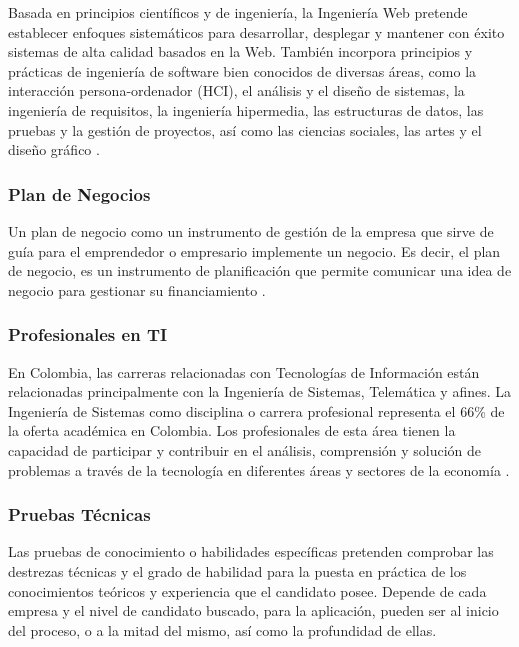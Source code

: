Basada en principios científicos y de ingeniería, la Ingeniería Web pretende establecer enfoques sistemáticos para desarrollar, desplegar y mantener con éxito sistemas de alta calidad basados en la Web. También incorpora principios y prácticas de ingeniería de software bien conocidos de diversas áreas, como la interacción persona-ordenador (HCI), el análisis y el diseño de sistemas, la ingeniería de requisitos, la ingeniería hipermedia, las estructuras de datos, las pruebas y la gestión de proyectos, así como las ciencias sociales, las artes y el diseño gráfico \cite{webEngineer}.

\subsubsection*{Plan de Negocios}

Un plan de negocio como un instrumento de gestión de la empresa que sirve de guía para el emprendedor o empresario implemente un negocio. Es decir, el plan de negocio, es un instrumento de planificación que permite comunicar una idea de negocio para gestionar su financiamiento \cite{villaran}.

\subsubsection*{Profesionales en TI}

En Colombia, las carreras relacionadas con Tecnologías de Información están relacionadas principalmente con la Ingeniería de Sistemas, Telemática y afines. La Ingeniería de Sistemas como disciplina o carrera profesional representa el 66\% de la oferta académica en Colombia. Los profesionales de esta área tienen la capacidad de participar y contribuir en el análisis, comprensión y solución de problemas a través de la tecnología en diferentes áreas y sectores de la economía \cite{MinticProf}.

\subsubsection*{Pruebas Técnicas}

Las pruebas de conocimiento o habilidades específicas pretenden comprobar las destrezas técnicas y el grado de habilidad para la puesta en práctica de los conocimientos teóricos y experiencia que el candidato posee. Depende de cada empresa y el nivel de candidato buscado, para la aplicación, pueden ser al inicio del proceso, o a la mitad del mismo, así como la profundidad de ellas. \cite{pruebasTec} 

